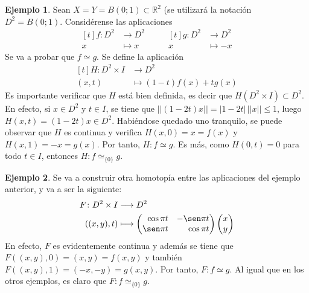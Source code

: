 \documentclass[11pt]{report}
\theoremstyle{definition}
\theoremstyle{definition}
\newtheorem{example}{Ejemplo}[chapter]
\theoremstyle{remark}
\newcommand{\R}{\mathbb R}
\begin{document}
\begin{example}
    Sean $X = Y = B(0;1) \subset \R^2$ (se utilizará la notación $D^2 = B(0;1)$. Considérense las aplicaciones
\[
\begin{aligned}[t]
    f \colon D^2 &\longrightarrow D^2 \\
    x &\longmapsto x
\end{aligned}
\qquad
\begin{aligned}[t]
    g \colon D^2 &\longrightarrow D^2 \\
    x &\longmapsto -x
\end{aligned}
\]
Se va a probar que $f \simeq g$. Se define la aplicación
\[
\begin{aligned}[t]
    H \colon D^2 \times I &\longrightarrow D^2 \\
    (x,t) &\longmapsto (1-t)f(x)+tg(x)
\end{aligned}
\]
Es importante verificar que $H$ está bien definida, es decir que $H(D^2 \times I) \subset D^2$. En efecto, si $x \in D^2$ y $t \in I$, se tiene que $||(1-2t)x|| = |1-2t| \, ||x|| \leq 1$, luego $H(x,t) = (1-2t)x \in D^2$. Habiéndose quedado uno tranquilo, se puede observar que $H$ es continua y verifica $H(x,0)= x= f(x)$ y $H(x,1) = -x = g(x)$. Por tanto, $H \colon f \simeq g$. Es más, como $H(0,t) = 0$ para todo $t \in I$, entonces $H \colon f \simeq_{\{0\}} g$. 
\end{example}

\begin{example}
Se va a construir otra homotopía entre las aplicaciones del ejemplo anterior, y va a ser la siguiente:
\[
\begin{aligned}[t]
    F \colon D^2 \times I &\longrightarrow D^2 \\
    ((x,y),t) &\longmapsto \begin{pmatrix*}[r]
        \cos \pi t & -\sen \pi t \\
        \sen \pi t & \cos \pi t
    \end{pmatrix*} \begin{pmatrix*}
        x \\
        y
    \end{pmatrix*}
\end{aligned}
\]
En efecto, $F$ es evidentemente continua y además se tiene que $F((x,y),0) = (x,y) = f(x,y)$ y también $F((x,y),1) = (-x,-y) = g(x,y)$. Por tanto, $F \colon f \simeq g$. Al igual que en los otros ejemplos, es claro que $F \colon f \simeq_{\{0\}} g$.
\end{example}
\end{document}
